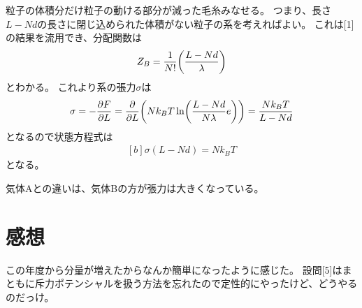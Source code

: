 \documentclass[../ap_2012.tex]{subfiles}
\begin{document}
\section{}
粒子の体積分だけ粒子の動ける部分が減った毛糸みなせる。
つまり、長さ\(L-Nd\)の長さに閉じ込められた体積がない粒子の系を考えればよい。
これは[1]の結果を流用でき、分配関数は
\begin{equation}\begin{aligned}[b]
    Z_B= \frac{1}{N!}\qty(\frac{L-Nd}{\lambda})
\end{aligned}\end{equation}
とわかる。
これより系の張力\(\sigma\)は
\begin{equation}\begin{aligned}[b]
    \sigma = -\pdv{F}{L}
    = \pdv{L}\qty(Nk_BT\ln(\frac{L-Nd}{N\lambda}e))
    =\frac{Nk_BT}{L-Nd}
\end{aligned}\end{equation}
となるので状態方程式は
\begin{equation}\begin{aligned}[b]
    \sigma(L-Nd)=Nk_BT
\end{aligned}\end{equation}
となる。

気体Aとの違いは、気体Bの方が張力は大きくなっている。


\section*{感想}
この年度から分量が増えたからなんか簡単になったように感じた。
設問[5]はまともに斥力ポテンシャルを扱う方法を忘れたので定性的にやったけど、どうやるのだっけ。
\end{document}

